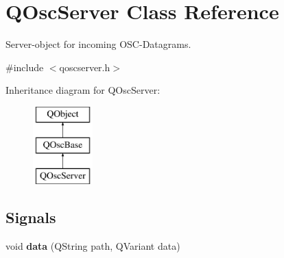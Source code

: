 \hypertarget{class_q_osc_server}{}\section{Q\+Osc\+Server Class Reference}
\label{class_q_osc_server}


Server-\/object for incoming O\+S\+C-\/\+Datagrams.  




{\ttfamily \#include $<$qoscserver.\+h$>$}

Inheritance diagram for Q\+Osc\+Server\+:\begin{figure}[H]
\begin{center}
\leavevmode
\includegraphics[height=3.000000cm]{class_q_osc_server}
\end{center}
\end{figure}
\subsection*{Signals}
\begin{DoxyCompactItemize}
\item 
\mbox{\label{class_q_osc_server_a2e722eed1b30ade81b854d60d39ba791}} 
void {\bfseries data} (Q\+String path, Q\+Variant data)
\end{DoxyCompactItemize}
